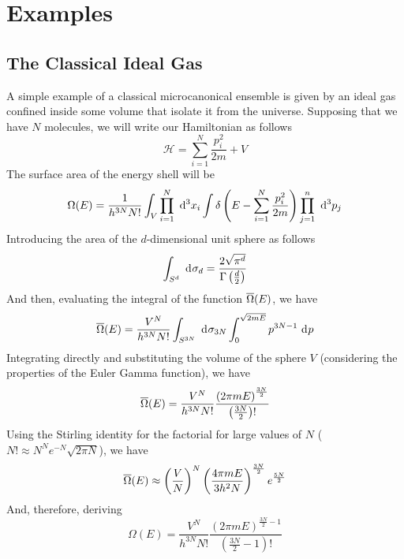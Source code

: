 \documentclass[../qm.tex]{subfiles}
\begin{document}
		\section{Examples}
		\subsection{The Classical Ideal Gas}
		A simple example of a classical microcanonical ensemble is given by an ideal gas confined inside some volume that isolate it from the universe. Supposing that we have $N$ molecules, we will write our Hamiltonian as follows
		\begin{equation}
			\mathcal{H}=\sum_{i=1}^N\frac{p_i^2}{2m}+V
			\label{eq:classicalgas}
		\end{equation}
		The surface area of the energy shell will be
		\begin{equation}
			\Omega(E)=\frac{1}{h^{3N}N!}\int_{V}\prod_{i=1}^N\diff[3]{x_i}\int\delta\left( E-\sum_{i=1}^N\frac{p_i^2}{2m} \right)\prod_{j=1}^n\diff[3]{p_j}
			\label{eq:OmegaEclassicalidealgas}
		\end{equation}
		Introducing the area of the $d$-dimensional unit sphere as follows
		\begin{equation*}
			\int_{S^d}\ \mathrm{d}^{}\sigma_d=\frac{2\sqrt{\pi^d}}{\Gamma\left( \frac{d}{2} \right)}
		\end{equation*}
		And then, evaluating the integral of the function $\overline{\Omega}(E)$, we have
		\begin{equation}
			\cc{\Omega}(E)=\frac{V^N}{h^{3N}N!}\int_{S^{3N}}\diff{\sigma_{3N}}\int_{0}^{\sqrt{2mE}}p^{3N-1}\diff{p}
			\label{eq:omegabarE}
		\end{equation}
		Integrating directly and substituting the volume of the sphere $V$ (considering the properties of the Euler Gamma function), we have
		\begin{equation}
			\cc{\Omega}(E)=\frac{V^N}{h^{3N}N!}\frac{\left( 2\pi mE \right)^{\frac{3N}{2}}}{\left( \frac{3N}{2} \right)!}
			\label{eq:omegabaridealgas}
		\end{equation}
		Using the Stirling identity for the factorial for large values of $N$ ($N!\approx N^Ne^{-N}\sqrt{2\pi N}$), we have
		\begin{equation}
			\cc{\Omega}(E)\approx\left( \frac{V}{N} \right)^N\left( \frac{4\pi mE}{3h^2N} \right)^{\frac{3N}{2}}e^{\frac{5N}{2}}
			\label{eq:ccomegaebaridealgas}
		\end{equation}
		And, therefore, deriving
		\begin{equation}
			\Omega(E)=\frac{V^N}{h^{3N}N!}\frac{\left( 2\pi mE \right)^{\frac{3N}{2}-1}}{\left( \frac{3N}{2}-1 \right)!}
			\label{eq:OmegaEclassicalgascomplete}
		\end{equation}
\end{document}
